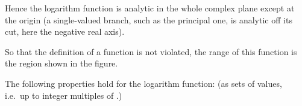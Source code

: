 \EMhold


\begin{EMunit}


\end{EMunit}

\begin{EMunit}

Hence the logarithm function is analytic in the whole complex plane except at the origin (a single-valued branch, such as the principal one, is analytic off its cut, here the negative real axis).



\end{EMunit}

\begin{EMunit}

So that the definition of a function is not violated, the range of this function is the region shown in the figure.


\end{EMunit}

The following properties hold for the logarithm function:
(as sets of values, i.e.~up to integer multiples of .)
